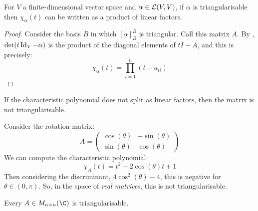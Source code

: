 \documentclass[../Main.tex]{subfiles}
\begin{document}
\begin{proposition}
    For $V$ a finite-dimensional vector space and $\alpha \in \mathcal{L}(V, V)$, if $\alpha$ is triangularisable then $\chi_\alpha(t)$ can be written as a product of linear factors.
    \label{propTriangularFactorise}
\end{proposition}
\begin{proof}
    Consider the basis $B$ in which $[\alpha]_B^B$ is triangular. Call this matrix $A$. By , $\det(t\operatorname{Id}_V - \alpha)$ is the product of the diagonal elements of $tI - A$, and this is precisely:
    \begin{equation*}
        \chi_\alpha(t) = \prod_{i=1}^{n} (t - a_{ii})
    \end{equation*}
\end{proof}
\begin{remark}
    If the characteristic polynomial does not split as linear factors, then the matrix is not triangularisable.
\end{remark}
\begin{example}
    Consider the rotation matrix:
    \begin{equation*}
        A =
        \begin{pmatrix}
            \cos(\theta) & -\sin(\theta) \\
            \sin(\theta) & \cos(\theta)
        \end{pmatrix}
    \end{equation*}
    We can compute the characteristic polynomial:
    \begin{equation*}
        \chi_A(t) = t^2 - 2\cos(\theta) t + 1
    \end{equation*}
    Then considering the discriminant, $4\cos^2(\theta) - 4$, this is negative for $\theta \in (0, \pi)$. So, in the space of \textit{real matrices}, this is not triangularisable.
\end{example}
\begin{theorem}
    Every $A \in M_{n \times n}(\C)$ is triangularisable.
    \label{thmComplexTriangular}
\end{theorem}
\end{document}
